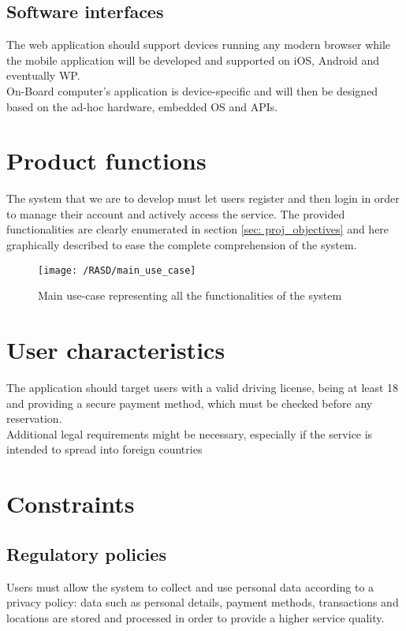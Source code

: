 \subsection{Software interfaces}
The web application should support devices running any modern browser while the mobile application will be developed and supported on iOS, Android and eventually WP. 
\\On-Board computer's application is device-specific and will then be designed based on the ad-hoc hardware, embedded OS and APIs.

\section{Product functions}
The system that we are to develop must let users register and then login in order to manage their account and actively access the service. The provided functionalities are clearly enumerated in section \ref{sec: proj_objectives} and here graphically described to ease the complete comprehension of the system.

\begin{figure}[!ht]
	\centering
	\vspace{0.2cm}
	\texttt{[image: /RASD/main\_use\_case]}\\ 
	\vspace{0.5cm}
	\caption{Main use-case representing all the functionalities of the system} \label{fig:main_use_case} 
\end{figure}

\section{User characteristics}
The application should target users with a valid driving license, being at least 18 and providing a secure payment method, which must be checked before any reservation.
\\Additional legal requirements might be necessary, especially if the service is intended to spread into foreign countries

\section{Constraints}

\subsection{Regulatory policies}
Users must allow the system to collect and use personal data according to a privacy policy: data such as personal details, payment methods, transactions and locations are stored and processed in order to provide a higher service quality.


